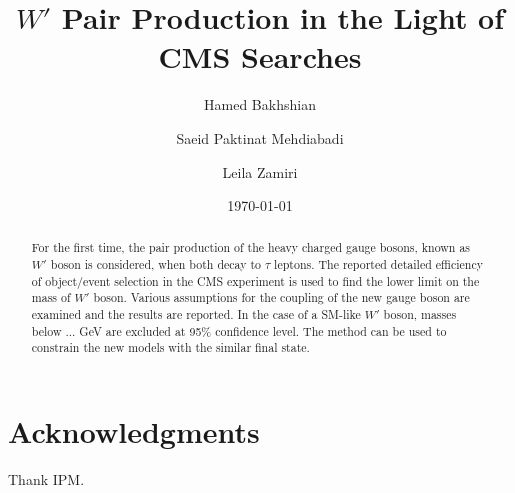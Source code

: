 \documentclass[preprint,showpacs,preprintnumbers]{revtex4}
\begin{document}
\linenumbers

\title{$W'$ Pair Production in the Light of CMS Searches}



\author{Hamed Bakhshian}

\author{Saeid Paktinat Mehdiabadi}

\author{Leila Zamiri}





\date{\today}

\begin{abstract}
For the first time, the pair production of the heavy charged gauge bosons, known as $W'$ boson is considered, when both decay to $\tau$ leptons. The reported detailed efficiency of object/event selection in the CMS experiment is used to find the lower limit on the mass of $W'$ boson. Various assumptions for the coupling of the new gauge boson are examined and the results are reported. In the case of a SM-like $W'$ boson, masses below ... GeV are excluded at 95\% confidence level. The method can be used to constrain the new models with the similar final state.
\end{abstract}


\pacs{}
\maketitle













\section{Acknowledgments}
Thank IPM.



\end{document}
